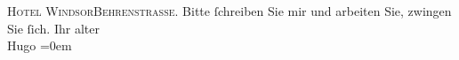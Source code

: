 \begin{ledgroupsized}[t]{13cm}
           \pstart
           \centering{}\textsc{Hotel Windsor\hspace*{1em}Behrenstrasse}.\pend
           \pstart
           \noindent{}Bitte ſchreiben Sie mir und arbeiten Sie, zwingen Sie
               ſich.\pend
           \pstart
           Ihr alter{\\[\baselineskip]}\spacefill\mbox{Hugo}\pend
           \leftskip=0em{}
         
         \endnumbering{}\end{ledgroupsized}  \newcommand{\dateiname}{L00907}\newcommand{\titel}{Hugo von Hofmannsthal an Arthur Schnitzler, [20. 3. 1899]}\newcommand{\editorInnen}{Martin Anton Müller und Gerd-Hermann Susen}
      